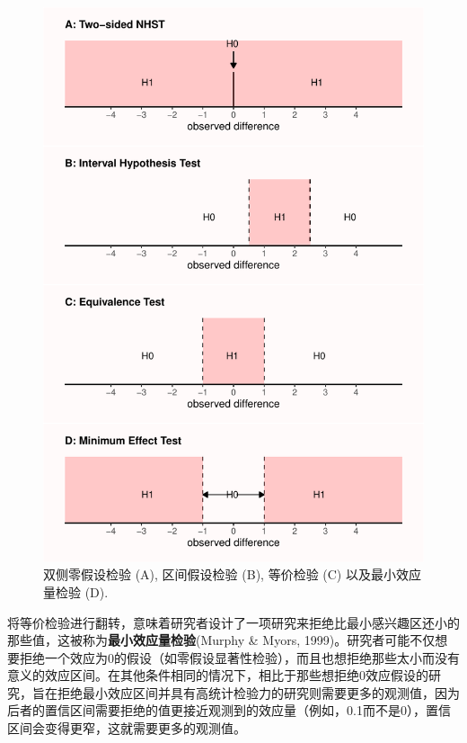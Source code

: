 \documentclass[
  letterpaper,
  DIV=11,
  numbers=noendperiod]{scrreprt}
\begin{document}
\begin{figure}

{\centering \includegraphics[width=1\textwidth,height=\textheight]{09-equivalencetest_files/figure-pdf/fig-intervaltest-1.pdf}

}

\caption{\label{fig-intervaltest}双侧零假设检验 (A), 区间假设检验 (B),
等价检验 (C) 以及最小效应量检验 (D).}

\end{figure}

将等价检验进行翻转，意味着研究者设计了一项研究来拒绝比最小感兴趣区还小的那些值，这被称为\textbf{最小效应量检验}(Murphy
\& Myors,
1999)。研究者可能不仅想要拒绝一个效应为0的假设（如零假设显著性检验），而且也想拒绝那些太小而没有意义的效应区间。在其他条件相同的情况下，相比于那些想拒绝0效应假设的研究，旨在拒绝最小效应区间并具有高统计检验力的研究则需要更多的观测值，因为后者的置信区间需要拒绝的值更接近观测到的效应量（例如，0.1而不是0），置信区间会变得更窄，这就需要更多的观测值。
\end{document}

